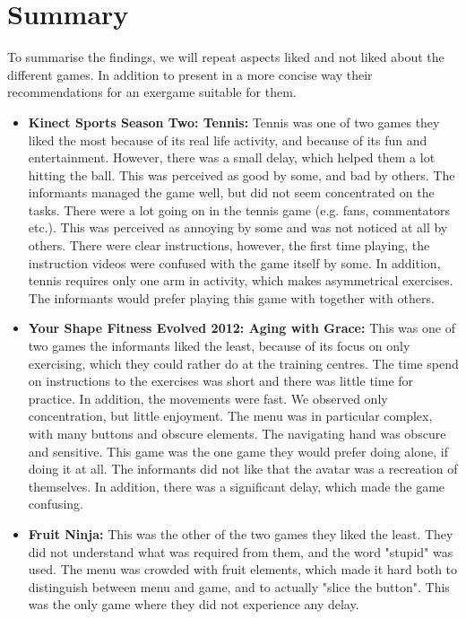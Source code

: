 \section{Summary}
To summarise the findings, we will repeat aspects liked and not liked about the different games. In addition to present in a more concise way their recommendations for an exergame suitable for them. 

\begin{itemize}
\item \textbf{Kinect Sports Season Two: Tennis:} Tennis was one of two games they liked the most because of its real life activity, and because of its fun and entertainment. However, there was a small delay, which helped them a lot hitting the ball. This was perceived as good by some, and bad by others. The informants managed the game well, but did not seem concentrated on the tasks. There were a lot going on in the tennis game (e.g. fans, commentators etc.). This was perceived as annoying by some and was not noticed at all by others. There were clear instructions, however, the first time playing, the instruction videos were confused with the game itself by some. In addition, tennis requires only one arm in activity, which makes asymmetrical exercises. The informants would prefer playing this game with together with others. 

\item \textbf{Your Shape Fitness Evolved 2012: Aging with Grace:} This was one of two games the informants liked the least, because of its focus on only exercising, which they could rather do at the training centres.  The time spend on instructions to the exercises was short and there was little time for practice. In addition, the movements were fast.  We observed only concentration, but little enjoyment. The menu was in particular complex, with many buttons and obscure elements. The navigating hand was obscure and sensitive. This game was the one game they would prefer doing alone, if doing it at all. The informants did not like that the avatar was a recreation of themselves. In addition, there was a significant delay, which made the game confusing.

\item \textbf{Fruit Ninja:} This was the other of the two games they liked the least.  They did not understand what was required from them, and the word "stupid" was used. The menu was crowded with fruit elements, which made it hard both to distinguish between menu and game, and to actually "slice the button". This was the only game where they did not experience any delay.


\end{itemize}
